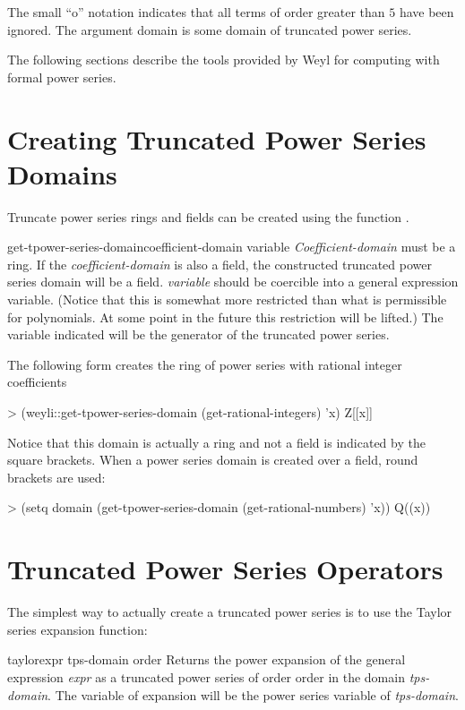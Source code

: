 \noindent
The small ``o''  notation indicates that all terms
of order greater than $5$ have been ignored.  The argument
domain is some domain of truncated power series. 
  
The following sections describe the tools provided by Weyl for
computing with formal power series.
  
\section{Creating Truncated Power Series Domains}

Truncate power series rings and fields can be created using the
function .

\begin{functiondef}{get-tpower-series-domain}{coefficient-domain variable}
{\em Coefficient-domain} must be a ring.  If the {\em
coefficient-domain} is also a field, the constructed truncated power
series domain will be a field.  {\em variable} should be coercible
into a general expression variable.  (Notice that this is somewhat
more restricted than what is permissible for polynomials.  At some
point in the future this restriction will be lifted.)  The variable
indicated will be the generator of the truncated power series.
\end{functiondef}
  
The following form creates the ring of power series
with rational integer coefficients
\begin{code}
> (weyli::get-tpower-series-domain (get-rational-integers) 'x)
Z[[x]]
\end{code}
  
\noindent
Notice that this domain is actually a ring and not a field is
indicated by the square brackets. When a power series domain is
created over a field, round brackets are used:
 
\begin{code}
> (setq domain (get-tpower-series-domain (get-rational-numbers) 'x))
Q((x))
\end{code}
  
\section{Truncated Power Series Operators}
  
The simplest way to actually create a truncated power series is to use
the Taylor series expansion function:
  
\begin{functiondef}{taylor}{expr tps-domain order}
Returns the power expansion of the general expression
{\em expr} as a truncated power series of order order in the
domain {\em tps-domain}. The variable of expansion will be
the power series variable of {\em tps-domain}.
\end{functiondef}
  
